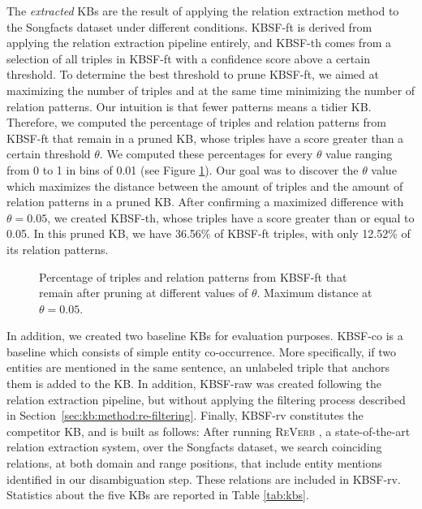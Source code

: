 The \textit{extracted} KBs are the result of applying the relation extraction method to the Songfacts dataset under different conditions. \textsc{KBSF}-ft is derived from applying the relation extraction pipeline entirely, and \textsc{KBSF}-th comes from a selection of all triples in \textsc{KBSF}-ft with a confidence score above a certain threshold. To determine the best threshold to prune \textsc{KBSF}-ft, we aimed at maximizing the number of triples and at the same time minimizing the number of relation patterns. Our intuition is that fewer patterns means a tidier KB. Therefore, we computed the percentage of triples and relation patterns from \textsc{KBSF}-ft that remain in a pruned KB, whose triples have a score greater than a certain threshold $\theta$. We computed these percentages for every $\theta$ value ranging from 0 to 1 in bins of 0.01 (see Figure \ref{fig:kb:th}). Our goal was to discover the $\theta$ value which maximizes the distance between the amount of triples and the amount of relation patterns in a pruned KB. After confirming a maximized difference with $\theta=0.05$, we created \textsc{KBSF}-th, whose triples have a score greater than or equal to 0.05. In this pruned KB, we have 36.56\% of \textsc{KBSF}-ft triples, with only 12.52\% of its relation patterns.

\begin{figure}[!htp]
\centerline{}
\caption[Percentage of triples and relation patterns from \textsc{KBSF}-ft.]{Percentage of triples and relation patterns from \textsc{KBSF}-ft that remain after pruning at different values of $\theta$. Maximum distance at $\theta=0.05$.}
\label{fig:kb:th}
\end{figure}

In addition, we created two baseline KBs for evaluation purposes. \textsc{KBSF}-co is a baseline which consists of simple entity co-occurrence. More specifically, if two entities are mentioned in the same sentence, an unlabeled triple that anchors them is added to the KB. In addition, \textsc{KBSF}-raw was created following the relation extraction pipeline, but without applying the filtering process described in Section~\ref{sec:kb:method:re-filtering}. Finally, \textsc{KBSF}-rv constitutes the competitor KB, and is built as follows: After running \textsc{ReVerb} \citep{Fader2011}, a state-of-the-art relation extraction system, over the Songfacts dataset, we search coinciding relations, at both domain and range positions, that include entity mentions identified in our disambiguation step. These relations are included in KBSF-rv. Statistics about the five KBs are reported in Table \ref{tab:kbs}.


